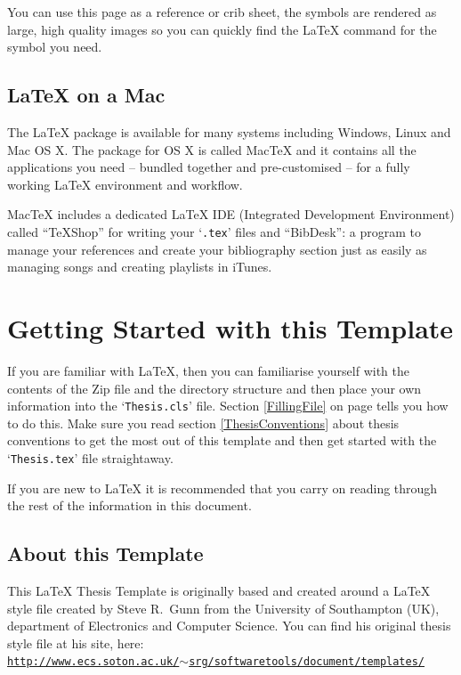 You can use this page as a reference or crib sheet, the symbols are rendered as large, high quality images so you can quickly find the \LaTeX{} command for the symbol you need.

\subsection{\LaTeX{} on a Mac}
 
The \LaTeX{} package is available for many systems including Windows, Linux and Mac OS X. The package for OS X is called MacTeX and it contains all the applications you need -- bundled together and pre-customised -- for a fully working \LaTeX{} environment and workflow.
 
MacTeX includes a dedicated \LaTeX{} IDE (Integrated Development Environment) called ``TeXShop'' for writing your `\texttt{.tex}' files and ``BibDesk'': a program to manage your references and create your bibliography section just as easily as managing songs and creating playlists in iTunes.


\section{Getting Started with this Template}

If you are familiar with \LaTeX{}, then you can familiarise yourself with the contents of the Zip file and the directory structure and then place your own information into the `\texttt{Thesis.cls}' file. Section \ref{FillingFile} on page \pageref{FillingFile} tells you how to do this. Make sure you read section \ref{ThesisConventions} about thesis conventions to get the most out of this template and then get started with the `\texttt{Thesis.tex}' file straightaway.

If you are new to \LaTeX{} it is recommended that you carry on reading through the rest of the information in this document.

\subsection{About this Template}

This \LaTeX{} Thesis Template is originally based and created around a \LaTeX{} style file created by Steve R.\ Gunn from the University of Southampton (UK), department of Electronics and Computer Science. You can find his original thesis style file at his site, here:\\
\href{http://www.ecs.soton.ac.uk/~srg/softwaretools/document/templates/}{\texttt{http://www.ecs.soton.ac.uk/$\sim$srg/softwaretools/document/templates/}}

